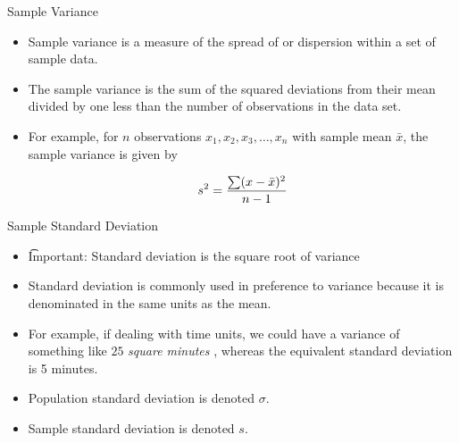{

	{Sample Variance}

\begin{itemize}

\item Sample variance is a measure of the spread of or dispersion within a set of sample data.
\smallskip
\item The sample variance is the sum of the squared deviations from their mean divided by one less than the number of observations in the data set.
\smallskip
\item For example, for $n$ observations $x_1, x_2, x_3, \ldots , x_n$  with sample mean $\bar{x}$, the sample variance is given by


 \[ s^2 = { \sum (x-\bar{x})^2  \over n-1}\]




\end{itemize}
}
{
	{Sample Standard Deviation}
\begin{itemize}
\item \t{Important:} Standard deviation is the square root of variance
\smallskip
\item Standard deviation is commonly used in preference to variance because it is denominated in the same units as the mean.
\smallskip
\item For example, if dealing with time units, we could have a variance of something like $25$ \emph{ square minutes }, whereas the equivalent standard deviation is 5 minutes.
\smallskip
\item Population standard deviation is denoted  $\sigma$.
\smallskip
\item Sample standard deviation is denoted $s$.
\end{itemize}
}


